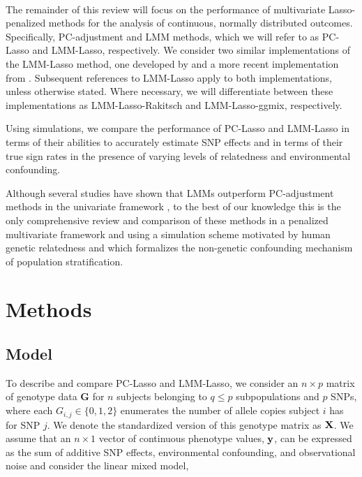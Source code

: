 \\
The remainder of this review will focus on the performance of multivariate Lasso-penalized methods for the analysis of continuous, normally distributed outcomes. Specifically, PC-adjustment and LMM methods, which we will refer to as PC-Lasso and LMM-Lasso, respectively. We consider two similar implementations of the LMM-Lasso method, one developed by \cite{Rakitsch2012} and a more recent implementation from \cite{bhatnagar2019simultaneous}. Subsequent references to LMM-Lasso apply to both implementations, unless otherwise stated. Where necessary, we will differentiate between these implementations as LMM-Lasso-Rakitsch and LMM-Lasso-ggmix, respectively. 

Using simulations, we compare the performance of PC-Lasso and LMM-Lasso in terms of their abilities to accurately estimate SNP effects and in terms of their true sign rates in the presence of varying levels of relatedness and environmental confounding. \\


Although several studies have shown that LMMs outperform PC-adjustment methods in the univariate framework \cite{wang2013analytical, kang2010variance, zhao2007arabidopsis}, to the best of our knowledge this is the only comprehensive review and comparison of these methods in a penalized multivariate framework and using a simulation scheme motivated by human genetic relatedness and which formalizes the non-genetic confounding mechanism of population stratification.\\



\section{Methods}



\subsection{Model}

To describe and compare PC-Lasso and LMM-Lasso, we consider an $n \times p$ matrix of genotype data $\boldsymbol{G}$ for $n$ subjects belonging to $q \le p$ subpopulations and $p$ SNPs, where each $G_{i,j} \in \{ 0, 1, 2 \}$ enumerates the number of allele copies subject $i$ has for SNP $j$. We denote the standardized version of this genotype matrix as $\textbf{X}$. We assume that an $n \times 1$ vector of continuous phenotype values, $\textbf{y}$, can be expressed as the sum of additive SNP effects, environmental confounding, and observational noise and consider the linear mixed model,

